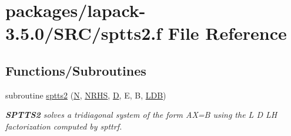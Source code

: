 \hypertarget{sptts2_8f}{}\section{packages/lapack-\/3.5.0/\+S\+R\+C/sptts2.f File Reference}
\label{sptts2_8f}
\subsection*{Functions/\+Subroutines}
\begin{DoxyCompactItemize}
\item 
subroutine \hyperlink{group__realPTcomputational_ga1dfc12ae89c5cdbc4bd375acbef09abb}{sptts2} (\hyperlink{polmisc_8c_a0240ac851181b84ac374872dc5434ee4}{N}, \hyperlink{example__user_8c_aa0138da002ce2a90360df2f521eb3198}{N\+R\+H\+S}, \hyperlink{odrpack_8h_a7dae6ea403d00f3687f24a874e67d139}{D}, E, B, \hyperlink{example__user_8c_a50e90a7104df172b5a89a06c47fcca04}{L\+D\+B})
\begin{DoxyCompactList}\small\item\em {\bfseries S\+P\+T\+T\+S2} solves a tridiagonal system of the form A\+X=B using the L D L\+H factorization computed by spttrf. \end{DoxyCompactList}\end{DoxyCompactItemize}
